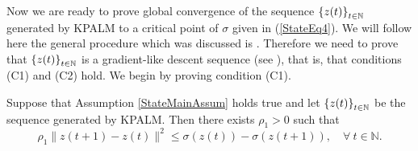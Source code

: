 Now we are ready to prove global convergence of the sequence $\left\lbrace z(t)\right\rbrace_{t \in \mathbb{N}}$ generated by KPALM to a critical point of $\sigma$ given in (\ref{StateEq4}). We will follow here the general procedure which was discussed is . Therefore we need to prove that $\left\lbrace z(t)\right\rbrace_{t \in \mathbb{N}}$ is a gradient-like descent sequence (see ), that is, that conditions (C1) and (C2) hold. We begin by proving condition (C1).

\begin{proposition} \label{State_KPALM_SDP}
Suppose that Assumption \ref{StateMainAssum} holds true and let $\left\lbrace z(t) \right\rbrace_{t \in \mathbb{N}}$ be the sequence generated by KPALM. Then there exists $\rho_1 > 0$ such that 
\begin{equation*}
	\rho_1 \|z(t+1) - z(t)\|^2 \leq \sigma(z(t)) - \sigma(z(t+1)), \quad \forall \: t \in \mathbb{N} .
\end{equation*}
\end{proposition}

